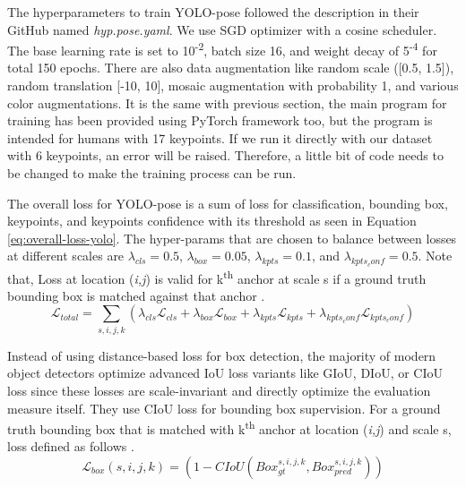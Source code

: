 



The hyperparameters to train YOLO-pose followed the description in their GitHub named \emph{hyp.pose.yaml}.
We use SGD optimizer with a cosine scheduler. The base learning rate is set to 10\textsuperscript{-2}, batch size 16,
and weight decay of 5\textsuperscript{-4} for total 150 epochs. There are also data augmentation like random scale ([0.5, 1.5]),
random translation [-10, 10], mosaic augmentation with probability 1, and various color augmentations.
It is the same with previous section, the main program for training has been provided using PyTorch framework too, but the program is intended for humans with 17 keypoints.
If we run it directly with our dataset with 6 keypoints, an error will be raised. Therefore, a little bit of code needs to be changed to make the training process can be run.

The overall loss for YOLO-pose is a sum of loss for classification, bounding box, keypoints, and keypoints confidence with its threshold as seen in Equation \ref{eq:overall-loss-yolo}.
The hyper-params that are chosen to balance between losses at different scales are $\lambda_{cls} = 0.5$, $\lambda_{box} = 0.05$, $\lambda_{kpts} = 0.1$, and $\lambda_{kpts_conf} = 0.5$.
Note that, Loss at location (\emph{i,j}) is valid for k\textsuperscript{th} anchor at scale s if a ground truth bounding box is matched against that anchor \parencite{maji2022yolopose}.
\begin{equation}
  \label{eq:overall-loss-yolo}
  \mathcal{L}_{total} = \sum_{s,i,j,k} (\lambda_{cls}\mathcal{L}_{cls} + \lambda_{box}\mathcal{L}_{box} + \lambda_{kpts}\mathcal{L}_{kpts} + \lambda_{kpts_conf}\mathcal{L}_{kpts_conf})
\end{equation}

Instead of using distance-based loss for box detection, the majority of modern object detectors optimize advanced IoU loss variants like GIoU, DIoU, or CIoU loss since these losses are scale-invariant and directly optimize the evaluation measure itself.
They use CIoU loss for bounding box supervision. For a ground truth bounding box that is matched with k\textsuperscript{th} anchor at location (\emph{i,j}) and scale s, loss defined as follows \parencite{maji2022yolopose}.
\begin{equation}
  \label{eq:bbox-loss-yolo}
  \mathcal{L}_{box}(s,i,j,k) = (1 - CIoU(Box_{gt}^{s,i,j,k}, Box_{pred}^{s,i,j,k}))
\end{equation}

